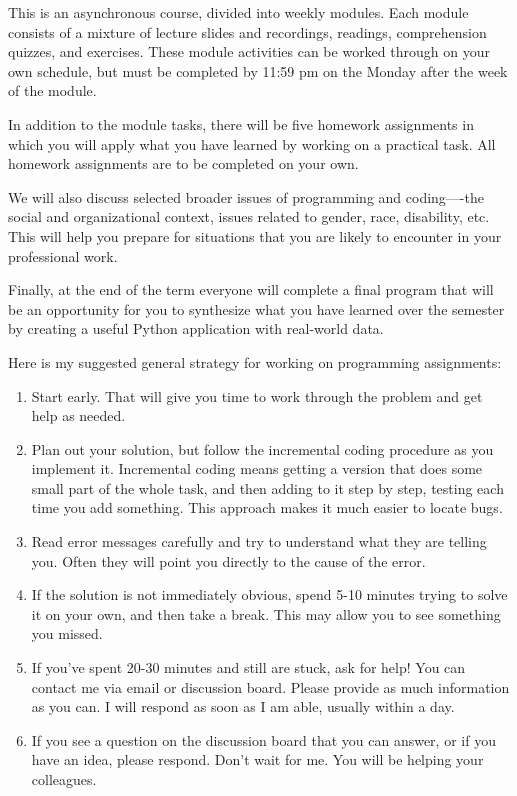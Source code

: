 \documentclass[11pt]{article}
\begin{document}
This is an asynchronous course, divided into weekly modules. Each module consists of a mixture of lecture slides and recordings, readings, comprehension quizzes, and exercises. These module activities can be worked through on your own schedule, but must be completed by 11:59 pm on the Monday after the week of the module.

In addition to the module tasks, there will be five homework assignments in which you will apply what you have learned by working on a practical task. All homework assignments are to be completed on your own.

We will also discuss selected broader issues of programming and coding—-the social and organizational context, issues related to gender, race, disability, etc. This will help you prepare for situations that you are likely to encounter in your professional work.

Finally, at the end of the term everyone will complete a final program that will be an opportunity for you to synthesize what you have learned over the semester by creating a useful Python application with real-world data.

Here is my suggested general strategy for working on programming assignments:

\begin{enumerate}
	\item Start early. That will give you time to work through the problem and get help as needed.
	\item Plan out your solution, but follow the incremental coding procedure as you implement it. Incremental coding means getting a version that does some small part of the whole task, and then adding to it step by step, testing each time you add something. This approach makes it much easier to locate bugs.
	\item Read error messages carefully and try to understand what they are telling you. Often they will point you directly to the cause of the error.
	\item If the solution is not immediately obvious, spend 5-10 minutes trying to solve it on your own, and then take a break. This may allow you to see something you missed.
	\item If you’ve spent 20-30 minutes and still are stuck, ask for help! You can contact me via email or discussion board. Please provide as much information as you can. I will respond as soon as I am able, usually within a day.
	\item If you see a question on the discussion board that you can answer, or if you have an idea, please respond. Don’t wait for me. You will be helping your colleagues.
\end{enumerate}
\end{document}
